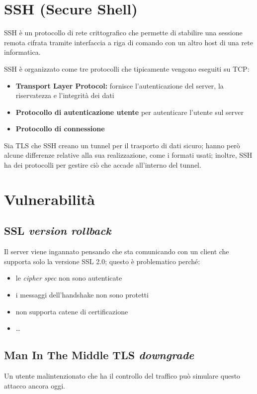 \section{SSH (Secure Shell)}
SSH è un protocollo di rete crittografico che permette di stabilire una sessione remota cifrata tramite interfaccia a riga di comando con un altro host di una rete informatica.

\noindent SSH è organizzato come tre protocolli che tipicamente vengono eseguiti su TCP:
\begin{itemize}
    \item \textbf{Transport Layer Protocol:} fornisce l'autenticazione del server, la riservatezza e l'integrità
    dei dati 
    \item \textbf{Protocollo di autenticazione utente} per autenticare l'utente sul server
    \item \textbf{Protocollo di connessione}
\end{itemize}

\noindent Sia TLS che SSH creano un tunnel per il trasporto di dati sicuro; hanno però alcune
differenze relative alla sua realizzazione, come i formati usati; inoltre, SSH ha dei protocolli 
per gestire ciò che accade all'interno del tunnel.


\section{Vulnerabilità}

\subsection{SSL \textit{version rollback}}
Il server viene ingannato pensando che sta comunicando con un client che 
supporta solo la versione SSL 2.0; questo è problematico perché:
\begin{itemize}
    \item le \textit{cipher spec} non sono autenticate 
    \item i messaggi dell'handshake non sono protetti 
    \item non supporta catene di certificazione
    \item \dots
\end{itemize}

\subsection{Man In The Middle TLS \textit{downgrade}}
Un utente malintenzionato che ha il controllo del traffico può simulare 
questo attacco ancora oggi.


